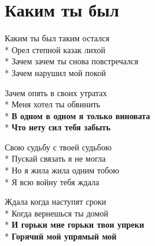\vspace{\fill}\newpage

\section{Каким ты был}
\label{song:Каким_ты_был}

\medskip

\begin{minipage}{\linewidth}
Каким ты был таким остался\\*
Орел степной казак лихой\\*
Зачем зачем ты снова повстречался\\*
Зачем нарушил мой покой\\
\end{minipage}\par\medskip\nobreak

\medskip

\begin{minipage}{\linewidth}
Зачем опять в своих утратах\\*
Меня хотел ты обвинить\\*
\textbf{В одном в одном я только виновата}\\*
\textbf{Что нету сил тебя забыть}\\
\end{minipage}\par\medskip\nobreak

\medskip

\begin{minipage}{\linewidth}
Свою судьбу с твоей судьбою\\*
Пускай связать я не могла\\*
Но я жила жила одним тобою\\*
Я всю войну тебя ждала\\
\end{minipage}\par\medskip\nobreak

\medskip

\begin{minipage}{\linewidth}
Ждала когда наступят сроки\\*
Когда вернешься ты домой\\*
\textbf{И горьки мне горьки твои упреки}\\*
\textbf{Горячий мой упрямый мой}\\
\end{minipage}\par\medskip\nobreak

